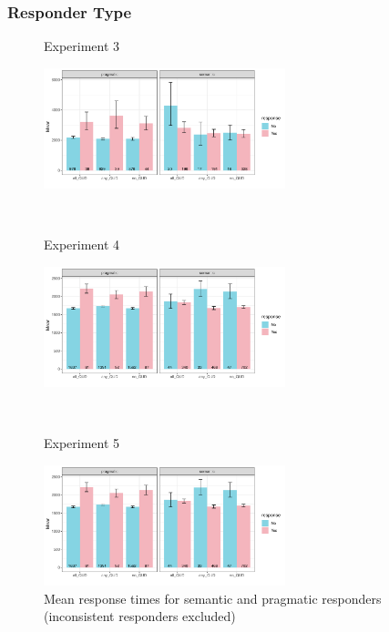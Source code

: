\documentclass[12pt]{article}
\begin{document}
\subsubsection*{Responder Type}
\begin{figure}[!ht] 
    \begin{minipage}{.5\textwidth}
        \caption*{Experiment 3}
        \includegraphics[height=3.5cm]{img/exp3_responder.pdf}
    \end{minipage}%
    \\
    \begin{minipage}{.5\textwidth}
        \caption*{Experiment 4}
        \includegraphics[height=3.5cm]{img/exp4_responder.pdf}
    \end{minipage}%
    \\
    \begin{minipage}{.5\textwidth}
        \caption*{Experiment 5}
        \includegraphics[height=3.5cm]{img/exp4_responder.pdf}
    \end{minipage}%
    \caption{Mean response times for semantic and pragmatic responders (inconsistent responders excluded)}
\end{figure}
\end{document}
